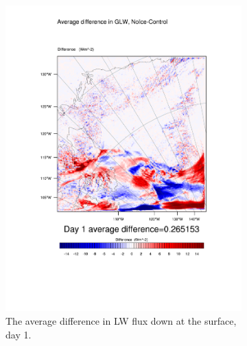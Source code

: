\begin{figure}
	\begin{subfigure}{0.48\textwidth}
		\centering
		\includegraphics[width=\textwidth]{results/noice/diff_NoIce_GLW_Day1.pdf}
		\caption{The average difference in LW flux down at the surface, day 1.}
		\label{subfig:glw_r2Day1}
	\end{subfigure}
	\quad
	\begin{subfigure}{0.48\textwidth}
		\centering

\end{subfigure}
\end{figure}
